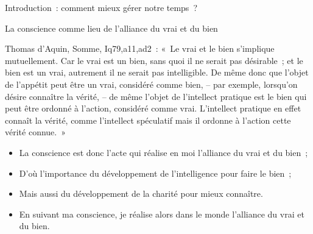 \documentclass[11pt,xcolor=dvipsname,ignorenonframetext,handout]{beamer}
\begin{document}
\begin{frame}{Introduction~: comment mieux gérer notre temps~?}
\begin{frame}{La conscience comme lieu de l'alliance du vrai et du bien}
    \begin{block}{Thomas d'Aquin, Somme, Iq79,a11,ad2~:}
        \rightskip=0pt\leftskip=0pt
        «~Le vrai et le bien s'implique mutuellement. Car le vrai est un bien, sans quoi il ne serait pas désirable~; et le bien est un vrai, autrement il ne serait pas intelligible. De même donc que l'objet de l'appétit peut être un vrai, considéré comme bien, -- par exemple, lorsqu'on désire connaître la vérité, -- de même l'objet de l'intellect pratique est le bien qui peut être ordonné à l'action, considéré comme vrai. L'intellect pratique en effet connaît la vérité, comme l'intellect spéculatif mais il ordonne à l'action cette vérité connue.~»
    \end{block}
    \begin{itemize}
        \rightskip=0pt\leftskip=0pt
        \item La conscience est donc l'acte qui réalise en moi l'alliance du vrai et du bien~;
        \item D'où l'importance du développement de l'intelligence pour faire le bien~;
        \item Mais aussi du développement de la charité pour mieux connaître.
        \item En suivant ma conscience, je réalise alors dans le monde l'alliance du vrai et du bien.
    \end{itemize}
\end{frame}

\end{frame}
\end{document}
